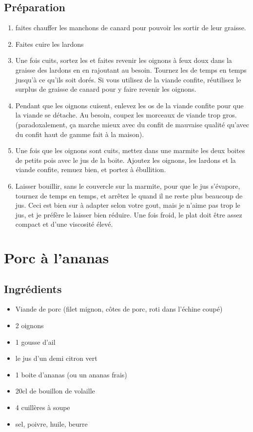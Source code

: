 \subsection*{Préparation}
\begin{enumerate}
\item faites chauffer les manchons de canard pour pouvoir les sortir de leur graisse.
\item Faites cuire les lardons
\item Une fois cuits, sortez les et faites revenir les oignons à feux doux dans la graisse des lardons en en rajoutant au besoin. Tournez les de temps en temps jusqu'à ce qu'ils soit dorés. Si vous utilisez de la viande confite, réutilisez le surplus de graisse de canard pour y faire revenir les oignons.
\item Pendant que les oignons cuisent, enlevez les os de la viande confite pour que la viande se détache. Au besoin, coupez les morceaux de viande trop gros. (paradoxalement, ça marche mieux avec du confit de mauvaise qualité qu'avec du confit haut de gamme fait à la maison).
\item Une fois que les oignons sont cuits, mettez dans une marmite les deux boites de petits pois avec le jus de la boite. Ajoutez les oignons, les lardons et la viande confite, remuez bien, et portez à ébullition.
\item Laisser bouillir, sans le couvercle sur la marmite, pour que le jus s'évapore, tournez de temps en temps, et arrêtez le quand il ne reste plus beaucoup de jus. Ceci est bien sur à adapter selon votre gout, mais je n'aime pas trop le jus, et je préfère le laisser bien réduire. Une fois froid, le plat doit être assez compact et d'une viscosité élevé.
\end{enumerate}

\newpage
\section{Porc à l'ananas}
\subsection*{Ingrédients}
\begin{itemize}
\item Viande de porc (filet mignon, côtes de porc, roti dans l'échine coupé)
\item 2 oignons
\item 1 gousse d'ail
\item le jus d'un demi citron vert
\item 1 boite d'ananas (ou un ananas frais)
\item 20cl de bouillon de volaille
\item 4 cuillères à soupe
\item sel, poivre, huile, beurre
\end{itemize}

